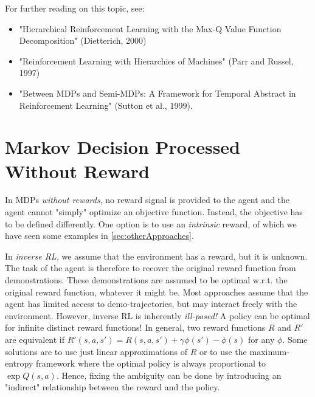 		For further reading on this topic, see:
		\begin{itemize}
			\item "Hierarchical Reinforcement Learning with the Max-Q Value Function Decomposition" (Dietterich, 2000)
			\item "Reinforcement Learning with Hierarchies of Machines" (Parr and Russel, 1997)
			\item "Between \acp{MDP} and Semi-\acp{MDP}: A Framework for Temporal Abstract in Reinforcement Learning" (Sutton et al., 1999).
		\end{itemize}

	\section{Markov Decision Processed Without Reward}
		In \acp{MDP} \emph{without rewards}, no reward signal is provided to the agent and the agent cannot "simply" optimize an objective function. Instead, the objective has to be defined differently. One option is to use an \emph{intrinsic} reward, of which we have seen some examples in \autoref{sec:otherApproaches}.

		In \emph{inverse \ac{RL},} we assume that the environment has a reward, but it is unknown. The task of the agent is therefore to recover the original reward function from demonstrations. These demonstrations are assumed to be optimal w.r.t. the original reward function, whatever it might be. Most approaches assume that the agent has limited access to demo-trajectories, but may interact freely with the environment. However, inverse \ac{RL} is inherently \emph{ill-posed!} A policy can be optimal for infinite distinct reward functions! In general, two reward functions \(R\) and \(R'\) are equivalent if \( R'(s, a, s') = R(s, a, s') + \gamma \phi(s') - \phi(s) \) for any \(\phi\). Some solutions are to use just linear approximations of \(R\) or to use the maximum-entropy framework where the optimal policy is always proportional to \( \exp Q(s, a) \). Hence, fixing the ambiguity can be done by introducing an "indirect" relationship between the reward and the policy.

